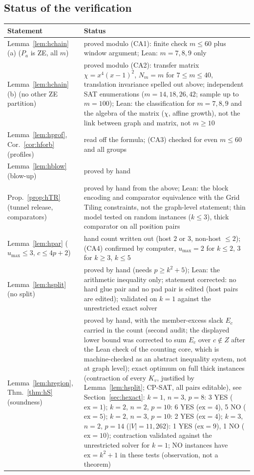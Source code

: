 \subsection{Status of the verification}\label{sec:hstatus}
\begin{center}
\small
\begin{tabular}{@{}p{}p{}@{}}
\hline
Statement & Status\\\hline
Lemma~\ref{lem:hchain}(a) ($P_a$ is ZE, all $m$) & proved modulo (CA1): finite check $m\le60$ plus window argument; Lean: $m=7,8,9$ only\\
Lemma~\ref{lem:hchain}(b) (no other ZE partition) & proved modulo (CA2): transfer matrix $\chi=x^4(x-1)^2$, $N_m=m$ for $7\le m\le40$, translation invariance spelled out above; independent SAT enumerations ($m=14,18,26,42$; sample up to $m=100$); Lean: the classification for $m=7,8,9$ and the algebra of the matrix ($\chi$, affine growth), not the link between graph and matrix, not $m\ge10$\\
Lemma~\ref{lem:hprof}, Cor.~\ref{cor:hforb} (profiles) & read off the formula; (CA3) checked for even $m\le60$ and all groups\\
Lemma~\ref{lem:hblow} (blow-up) & proved by hand\\
Prop.~\ref{prop:hTR} (tunnel release, comparators) & proved by hand from the above; Lean: the block encoding and comparator equivalence with the Grid Tiling constraints, not the graph-level statement; thin model tested on random instances ($k\le3$), thick comparator on all position pairs\\
Lemma~\ref{lem:hpar} ($u_{\max}\le3$, $c\le4p+2$) & hand count written out (host $2$ or $3$, non-host $\le2$); (CA4) confirmed by computer, $u_{\max}=2$ for $k\le2$, $3$ for $k\ge3$, $k\le5$\\
Lemma~\ref{lem:hsplit} (no split) & proved by hand (needs $p\ge k^2+5$); Lean: the arithmetic inequality only; statement corrected: no hard glue pair and no pad pair is edited (host pairs are edited); validated on $k=1$ against the unrestricted exact solver\\
Lemma~\ref{lem:hregion}, Thm.~\ref{thm:hS} (soundness) & proved by hand, with the member-excess slack $E_c$ carried in the count (second audit; the displayed lower bound was corrected to sum $E_c$ over $c\notin Z$ after the Lean check of the counting core, which is machine-checked as an abstract inequality system, not at graph level); exact optimum on full thick instances (contraction of every $K_v$, justified by Lemma~\ref{lem:hsplit}; CP-SAT, all pairs editable), see Section~\ref{sec:hexact}: $k=1$, $n=3$, $p=8$: 3 YES ($\mathrm{ex}=1$); $k=2$, $n=2$, $p=10$: 6 YES ($\mathrm{ex}=4$), 5 NO ($\mathrm{ex}=5$); $k=2$, $n=3$, $p=10$: 2 YES ($\mathrm{ex}=4$); $k=3$, $n=2$, $p=14$ ($|V|=11{,}262$): 1 YES ($\mathrm{ex}=9$), 1 NO ($\mathrm{ex}=10$); contraction validated against the unrestricted solver for $k=1$; NO instances have $\mathrm{ex}=k^2+1$ in these tests (observation, not a theorem)\\

\end{tabular}
\end{center}

